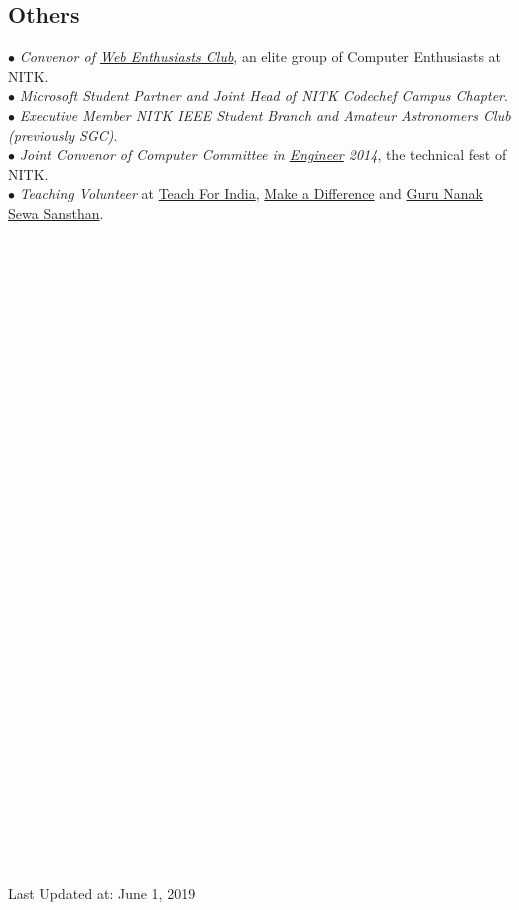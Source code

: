 \documentclass[margin,line]{resume}
\begin{document}
\begin{resume}
         
    \section{\mysidestyle \bf Others}
 $\bullet$ {\it Convenor of \href{https://webclub-nitk.github.io/}{Web Enthusiasts Club}}, an elite group of Computer Enthusiasts at NITK. \\
 $\bullet$ {\it Microsoft Student Partner and Joint Head of NITK Codechef Campus Chapter}. \\
     $\bullet$ {\it Executive Member NITK IEEE Student Branch and Amateur Astronomers Club (previously SGC)}. \\
     $\bullet$ {\it Joint Convenor of Computer Committee in \href{http://www.nitk.ac.in/students-activities/engineer}{Engineer} 2014}, the technical fest of NITK. \\
$\bullet$ {\it Teaching Volunteer} at \href{http://www.teachforindia.org/}{Teach For India}, \href{http://makeadiff.in/}{Make a Difference} and \href{https://www.nanakg.org/}{Guru Nanak Sewa Sansthan}.
    \\\\\\\\\\\\\\\\\\\\\\\\\\\\\\\\\\\\\\\\\\\\\\\\\\\\\\\\\\\\\\\\\\\\
\begin{footnotesize}
Last Updated at: June 1, 2019
\end{footnotesize}
\end{resume}
\end{document}
